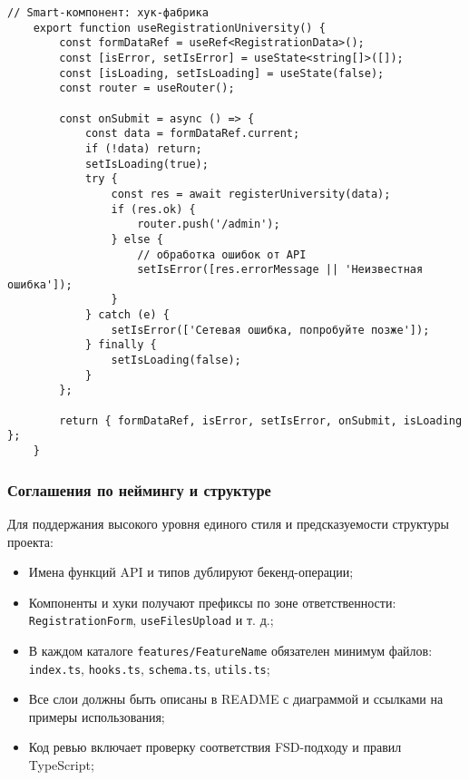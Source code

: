 \begin{lstlisting}[breaklines=true,caption=useRegistrationUniversity]
	// Smart-компонент: хук-фабрика
	export function useRegistrationUniversity() {
		const formDataRef = useRef<RegistrationData>();
		const [isError, setIsError] = useState<string[]>([]);
		const [isLoading, setIsLoading] = useState(false);
		const router = useRouter();
		
		const onSubmit = async () => {
			const data = formDataRef.current;
			if (!data) return;
			setIsLoading(true);
			try {
				const res = await registerUniversity(data);
				if (res.ok) {
					router.push('/admin');
				} else {
					// обработка ошибок от API
					setIsError([res.errorMessage || 'Неизвестная ошибка']);
				}
			} catch (e) {
				setIsError(['Сетевая ошибка, попробуйте позже']);
			} finally {
				setIsLoading(false);
			}
		};
		
		return { formDataRef, isError, setIsError, onSubmit, isLoading };
	}
\end{lstlisting}

\subsubsection{Соглашения по неймингу и структуре}

Для поддержания высокого уровня единого стиля и предсказуемости структуры проекта:

\begin{itemize}
	\item Имена функций API и типов дублируют бекенд-операции;
	\item Компоненты и хуки получают префиксы по зоне ответственности: \texttt{RegistrationForm}, \texttt{useFilesUpload} и т. д.;
	\item В каждом каталоге \texttt{features/FeatureName} обязателен минимум файлов: \texttt{index.ts}, \texttt{hooks.ts}, \texttt{schema.ts}, \texttt{utils.ts};
	\item Все слои должны быть описаны в README с диаграммой и ссылками на примеры использования;
	\item Код ревью включает проверку соответствия FSD-подходу и правил TypeScript;
\end{itemize}
